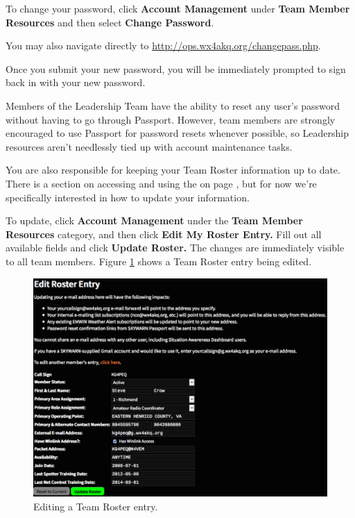 \documentclass[pdflatex,letterpaper,twoside,12pt]{book}
\begin{document}
To change your password, click \textbf{Account Management} under \textbf{Team Member Resources} and then select \textbf{Change Password}.

You may also navigate directly to \href{http://ops.wx4akq.org/changepass.php}{http://ops.wx4akq.org/changepass.php}.

Once you submit your new password, you will be immediately prompted to sign back in with your new password.


Members of the Leadership Team have the ability to reset any user's password without having to go through Passport.  However, team members are strongly encouraged to use Passport for password resets whenever possible, so Leadership resources aren't needlessly tied up with account maintenance tasks.

You are also responsible for keeping your Team Roster information up to date.  There is a section on accessing and using the  on page \pageref{team-roster}, but for now we're specifically interested in how to update your information.

To update, click \textbf{Account Management} under the \textbf{Team Member Resources} category, and then click \textbf{Edit My Roster Entry.}  Fill out all available fields and click \textbf{Update Roster.}  The changes are immediately visible to all team members.  Figure \ref{fig:ops-roster-edit} shows a Team Roster entry being edited.

\begin{figure}[h]
  \centering
  \includegraphics[width=\textwidth,keepaspectratio=true]{img/ops-roster-edit-cropped}
  \caption{Editing a Team Roster entry.\label{fig:ops-roster-edit}}
\end{figure}
\end{document}
